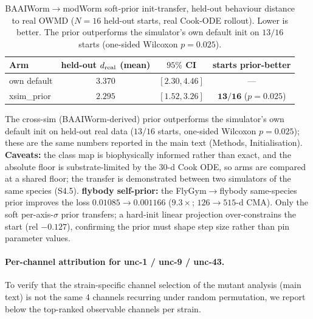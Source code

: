 \documentclass[11pt]{article}
\begin{document}
\begin{table}[H]\centering\small
\caption{BAAIWorm$\to$modWorm soft-prior init-transfer, held-out behaviour distance to real OWMD ($N{=}16$ held-out starts, real Cook-ODE rollout). Lower is better. The prior outperforms the simulator's own default init on $13/16$ starts (one-sided Wilcoxon $p{=}0.025$).}
\begin{tabular}{lccc}\toprule
Arm & held-out $d_{\rm real}$ (mean) & $95\%$ CI & starts prior-better \\\midrule
own default  & 3.370 & $[2.30,4.46]$ & --- \\
xsim\_prior  & $\mathbf{2.295}$ & $[1.52,3.26]$ & $\mathbf{13/16}$ ($p{=}0.025$) \\\bottomrule
\end{tabular}
\end{table}
The cross-sim (BAAIWorm-derived) prior outperforms the simulator's own default init on held-out real data ($13/16$ starts, one-sided Wilcoxon $p{=}0.025$); these are the same numbers reported in the main text (Methods, Initialisation). \textbf{Caveats:} the class map is biophysically informed rather than exact, and the absolute floor is substrate-limited by the 30-d Cook ODE, so arms are compared at a shared floor; the transfer is demonstrated between two simulators of the same species (S4.5). \textbf{flybody self-prior:} the FlyGym$\to$flybody same-species prior improves the loss $0.01085\to0.001166$ ($9.3\times$; $126\to515$-d CMA). Only the soft per-axis-$\sigma$ prior transfers; a hard-init linear projection over-constrains the start (rel $-0.127$), confirming the prior must shape step size rather than pin parameter values.

\paragraph{Per-channel attribution for unc-1 / unc-9 / unc-43.}
To verify that the strain-specific channel selection of the mutant analysis (main text) is not the same 4 channels recurring under random permutation, we report below the top-ranked observable channels per strain.
\end{document}
